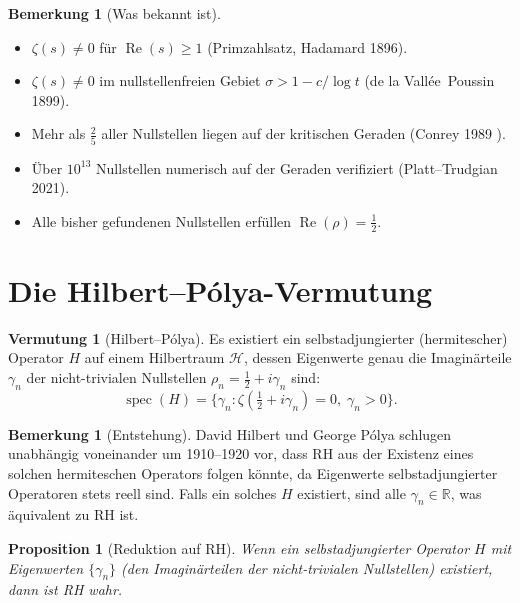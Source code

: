 \documentclass[12pt,a4paper]{amsart}
\newtheorem{proposition}[theorem]{Proposition}
\theoremstyle{definition}
\newtheorem{remark}[theorem]{Bemerkung}
\newtheorem{conjecture}[theorem]{Vermutung}
\newcommand{\R}{\mathbb{R}}
\DeclareMathOperator{\Re}{Re}
\DeclareMathOperator{\spec}{spec}
\begin{document}
\begin{remark}[Was bekannt ist]
\begin{itemize}
  \item $\zeta(s) \ne 0$ f\"ur $\Re(s) \ge 1$ (Primzahlsatz, Hadamard 1896).
  \item $\zeta(s) \ne 0$ im nullstellenfreien Gebiet $\sigma > 1 - c/\log t$
    (de la Vall\'ee~Poussin 1899).
  \item Mehr als $\tfrac{2}{5}$ aller Nullstellen liegen auf der kritischen
    Geraden (Conrey 1989 \cite{Conrey1989}).
  \item \"Uber $10^{13}$ Nullstellen numerisch auf der Geraden verifiziert
    (Platt--Trudgian 2021).
  \item Alle bisher gefundenen Nullstellen erf\"ullen $\Re(\rho) = \tfrac{1}{2}$.
\end{itemize}
\end{remark}

\section{Die Hilbert--P\'olya-Vermutung}

\begin{conjecture}[Hilbert--P\'olya]
\label{conj:hilbert_polya}
Es existiert ein selbstadjungierter (hermitescher) Operator $H$ auf
einem Hilbertraum $\mathcal{H}$, dessen Eigenwerte genau die
Imagin\"arteile $\gamma_n$ der nicht-trivialen Nullstellen
$\rho_n = \tfrac{1}{2} + i\gamma_n$ sind:
\[
  \spec(H) = \{\gamma_n : \zeta(\tfrac{1}{2} + i\gamma_n) = 0,\; \gamma_n > 0\}.
\]
\end{conjecture}

\begin{remark}[Entstehung]
David Hilbert und George P\'olya schlugen unabh\"angig voneinander um
1910--1920 vor, dass RH aus der Existenz eines solchen hermiteschen Operators
folgen k\"onnte, da Eigenwerte selbstadjungierter Operatoren stets reell sind.
Falls ein solches $H$ existiert, sind alle $\gamma_n \in \R$, was
\"aquivalent zu RH ist.
\end{remark}

\begin{proposition}[Reduktion auf RH]
Wenn ein selbstadjungierter Operator $H$ mit Eigenwerten $\{\gamma_n\}$
(den Imagin\"arteilen der nicht-trivialen Nullstellen) existiert,
dann ist RH wahr.
\end{proposition}
\end{document}
